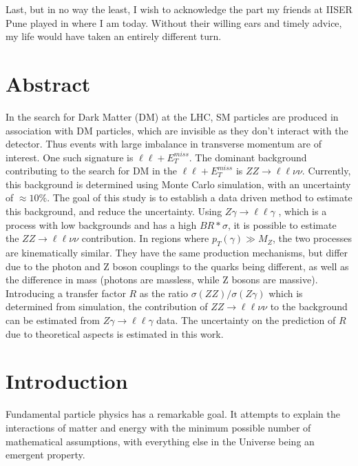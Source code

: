 \documentclass[12pt,a4paper,openright,twoside]{report}
\newcommand{\ZZ}{$ZZ\to \ell\ell\nu\nu$ }
\newcommand{\Zg}{$Z\gamma\to \ell\ell\gamma$ }
\newcommand\blankpage{%
    \null
    \thispagestyle{empty}%
    \addtocounter{page}{-1}%
    \newpage}
\begin{document}
Last, but in no way the least, I wish to acknowledge the part my friends at IISER Pune played in where I am today. Without their willing ears and timely advice, my life would have taken an entirely different turn.

\newpage
\blankpage
\newpage

\chapter*{Abstract}
\thispagestyle{plain}
\setcounter{page}{1}
In the search for Dark Matter (DM) at the LHC, SM particles are produced in association with DM particles, which are invisible as they don't interact with the detector. Thus events with large imbalance in transverse momentum are of interest. One such signature is $\ell\ell + E_T^{miss}$. The dominant background contributing to the search for DM in the $\ell\ell + E_T^{miss}$ is $ZZ \rightarrow \ell\ell\nu\nu$.  Currently, this background is determined using Monte Carlo simulation, with an uncertainty of $\approx 10\%$. The goal of this study is to establish a data driven method to estimate this background, and reduce the uncertainty. Using \Zg, which is a process with low backgrounds and has a high $BR*\sigma$, it is possible to estimate the \ZZ contribution. In regions where $p_{T}(\gamma) \gg M_{Z}$, the two processes are kinematically similar. They have the same production mechanisms, but differ due to the photon and Z boson couplings to the quarks being different, as well as the difference in mass (photons are massless, while Z bosons are massive). Introducing a transfer factor $R$ as the ratio $\sigma(ZZ)/\sigma(Z\gamma)$ which is determined from simulation, the contribution of \ZZ to the background can be estimated from \Zg data. The uncertainty on the prediction of $R$ due to theoretical aspects is estimated in this work.
\cleardoublepage

\tableofcontents
\cleardoublepage

\listoffigures
\listofmyequations
\listoftables
\cleardoublepage

\linenumbers
\chapter{Introduction}
\pagestyle{plain}
\setcounter{page}{1}
Fundamental particle physics has a remarkable goal. It attempts to explain the interactions of matter and energy with the minimum possible number of mathematical assumptions, with everything else in the Universe being an emergent property.
\end{document}
